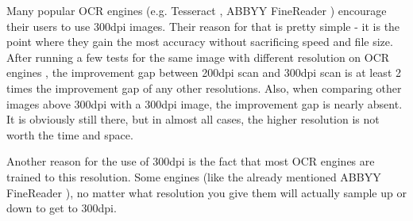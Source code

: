 Many popular OCR engines (e.g. Tesseract \citep{TesseractQual}, ABBYY FineReader \citep{ABBYYdpi}) encourage their users to use 300dpi images. Their reason for that is pretty simple - it is the point where they gain the most accuracy without sacrificing speed and file size. After running a few tests for the same image with different resolution on OCR engines \citep{preprocessAll}, the improvement gap between 200dpi scan and 300dpi scan is at least 2 times the improvement gap of any other resolutions. Also, when comparing other images above 300dpi with a 300dpi image, the improvement gap is nearly absent. It is obviously still there, but in almost all cases, the higher resolution is not worth the time and space. 

Another reason for the use of 300dpi is the fact that most OCR engines are trained to this resolution. Some engines (like the already mentioned ABBYY FineReader \citep{ABBYYdpi}), no matter what resolution you give them will actually sample up or down to get to 300dpi. 

